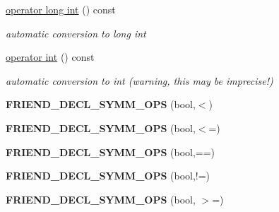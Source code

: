 \begin{DoxyCompactItemize}
\item 
\hyperlink{classMetaSim_1_1Tick_a18e9dcdaeaf35eca4411160645e40d9d}{operator long int} () const \hypertarget{classMetaSim_1_1Tick_a18e9dcdaeaf35eca4411160645e40d9d}{}\label{classMetaSim_1_1Tick_a18e9dcdaeaf35eca4411160645e40d9d}

\begin{DoxyCompactList}\small\item\em automatic conversion to long int \end{DoxyCompactList}\item 
\hyperlink{classMetaSim_1_1Tick_aff22cbee5dd1e6e60f14132496718a39}{operator int} () const \hypertarget{classMetaSim_1_1Tick_aff22cbee5dd1e6e60f14132496718a39}{}\label{classMetaSim_1_1Tick_aff22cbee5dd1e6e60f14132496718a39}

\begin{DoxyCompactList}\small\item\em automatic conversion to int (warning, this may be imprecise!) \end{DoxyCompactList}\item 
{\bfseries F\+R\+I\+E\+N\+D\+\_\+\+D\+E\+C\+L\+\_\+\+S\+Y\+M\+M\+\_\+\+O\+PS} (bool,$<$)\hypertarget{classMetaSim_1_1Tick_a3815cc158977e54a7c829bfdf20e40c2}{}\label{classMetaSim_1_1Tick_a3815cc158977e54a7c829bfdf20e40c2}

\item 
{\bfseries F\+R\+I\+E\+N\+D\+\_\+\+D\+E\+C\+L\+\_\+\+S\+Y\+M\+M\+\_\+\+O\+PS} (bool,$<$=)\hypertarget{classMetaSim_1_1Tick_a0dc5f436fe5ee41be09b2088a8135b87}{}\label{classMetaSim_1_1Tick_a0dc5f436fe5ee41be09b2088a8135b87}

\item 
{\bfseries F\+R\+I\+E\+N\+D\+\_\+\+D\+E\+C\+L\+\_\+\+S\+Y\+M\+M\+\_\+\+O\+PS} (bool,==)\hypertarget{classMetaSim_1_1Tick_a16dda82ac94545ae8e46defd9a25156a}{}\label{classMetaSim_1_1Tick_a16dda82ac94545ae8e46defd9a25156a}

\item 
{\bfseries F\+R\+I\+E\+N\+D\+\_\+\+D\+E\+C\+L\+\_\+\+S\+Y\+M\+M\+\_\+\+O\+PS} (bool,!=)\hypertarget{classMetaSim_1_1Tick_a8837e04368a6195a8bbf0fe9d97acfcf}{}\label{classMetaSim_1_1Tick_a8837e04368a6195a8bbf0fe9d97acfcf}

\item 
{\bfseries F\+R\+I\+E\+N\+D\+\_\+\+D\+E\+C\+L\+\_\+\+S\+Y\+M\+M\+\_\+\+O\+PS} (bool, $>$=)\hypertarget{classMetaSim_1_1Tick_a71b594111b80725201ac4cebdd1e510b}{}\label{classMetaSim_1_1Tick_a71b594111b80725201ac4cebdd1e510b}


\end{DoxyCompactItemize}
